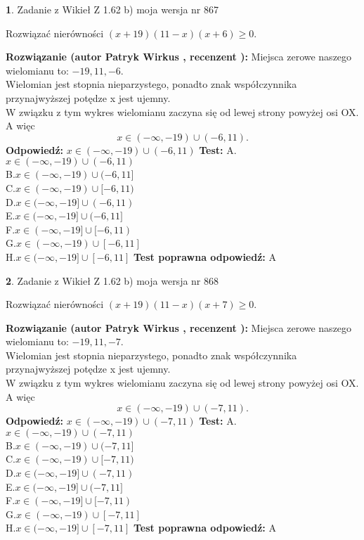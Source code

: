\documentclass[12pt, a4paper]{article}
\theoremstyle{definition} %
\newtheorem{zad}{}
\newcommand{\zadStart}[1]{\begin{zad}#1\newline}
\newcommand{\zadStop}{\end{zad}}
\newcommand{\rozwStart}[2]{\noindent \textbf{Rozwiązanie (autor #1 , recenzent #2): }\newline}
\newcommand{\rozwStop}{\newline}
\newcommand{\odpStart}{\noindent \textbf{Odpowiedź:}\newline}
\newcommand{\odpStop}{\newline}
\newcommand{\testStart}{\noindent \textbf{Test:}\newline}
\newcommand{\testStop}{\newline}
\newcommand{\kluczStart}{\noindent \textbf{Test poprawna odpowiedź:}\newline}
\newcommand{\kluczStop}{\newline}
\begin{document}
\zadStart{Zadanie z Wikieł Z 1.62 b) moja wersja nr 867}

Rozwiązać nierówności $(x+19)(11-x)(x+6)\ge0$.
\zadStop
\rozwStart{Patryk Wirkus}{}
Miejsca zerowe naszego wielomianu to: $-19, 11, -6$.\\
Wielomian jest stopnia nieparzystego, ponadto znak współczynnika przy\linebreak najwyższej potędze x jest ujemny.\\ W związku z tym wykres wielomianu zaczyna się od lewej strony powyżej osi OX. A więc $$x \in (-\infty,-19) \cup (-6,11).$$
\rozwStop
\odpStart
$x \in (-\infty,-19) \cup (-6,11)$
\odpStop
\testStart
A.$x \in (-\infty,-19) \cup (-6,11)$\\
B.$x \in (-\infty,-19) \cup (-6,11]$\\
C.$x \in (-\infty,-19) \cup [-6,11)$\\
D.$x \in (-\infty,-19] \cup (-6,11)$\\
E.$x \in (-\infty,-19] \cup (-6,11]$\\
F.$x \in (-\infty,-19] \cup [-6,11)$\\
G.$x \in (-\infty,-19) \cup [-6,11]$\\
H.$x \in (-\infty,-19] \cup [-6,11]$
\testStop
\kluczStart
A
\kluczStop



\zadStart{Zadanie z Wikieł Z 1.62 b) moja wersja nr 868}

Rozwiązać nierówności $(x+19)(11-x)(x+7)\ge0$.
\zadStop
\rozwStart{Patryk Wirkus}{}
Miejsca zerowe naszego wielomianu to: $-19, 11, -7$.\\
Wielomian jest stopnia nieparzystego, ponadto znak współczynnika przy\linebreak najwyższej potędze x jest ujemny.\\ W związku z tym wykres wielomianu zaczyna się od lewej strony powyżej osi OX. A więc $$x \in (-\infty,-19) \cup (-7,11).$$
\rozwStop
\odpStart
$x \in (-\infty,-19) \cup (-7,11)$
\odpStop
\testStart
A.$x \in (-\infty,-19) \cup (-7,11)$\\
B.$x \in (-\infty,-19) \cup (-7,11]$\\
C.$x \in (-\infty,-19) \cup [-7,11)$\\
D.$x \in (-\infty,-19] \cup (-7,11)$\\
E.$x \in (-\infty,-19] \cup (-7,11]$\\
F.$x \in (-\infty,-19] \cup [-7,11)$\\
G.$x \in (-\infty,-19) \cup [-7,11]$\\
H.$x \in (-\infty,-19] \cup [-7,11]$
\testStop
\kluczStart
A
\kluczStop
\end{document}
